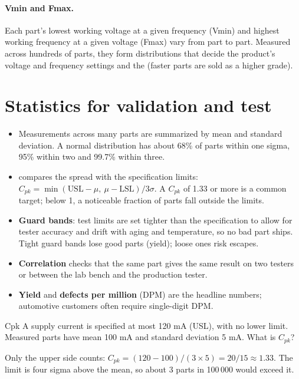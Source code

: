 \paragraph{Vmin and Fmax.} Each part's lowest working voltage at a given frequency (Vmin) and highest working frequency at a given voltage (Fmax) vary from part to part. Measured across hundreds of parts, they form distributions that decide the product's voltage and frequency settings and the  (faster parts are sold as a higher grade).

\section{Statistics for validation and test}

\begin{itemize}
  \item Measurements across many parts are summarized by mean and standard deviation. A normal distribution has about 68\% of parts within one sigma, 95\% within two and 99.7\% within three.
  \item {} compares the spread with the specification limits: $C_{pk} = \min(\text{USL} - \mu,\ \mu - \text{LSL}) / 3\sigma$. A $C_{pk}$ of 1.33 or more is a common target; below 1, a noticeable fraction of parts fall outside the limits.
  \item \textbf{Guard bands}: test limits are set tighter than the specification to allow for tester accuracy and drift with aging and temperature, so no bad part ships. Tight guard bands lose good parts (yield); loose ones risk escapes.
  \item \textbf{Correlation} checks that the same part gives the same result on two testers or between the lab bench and the production tester.
  \item \textbf{Yield} and \textbf{defects per million} (DPM) are the headline numbers; automotive customers often require single-digit DPM.
\end{itemize}

\begin{worked}{Cpk}
A supply current is specified at most 120 mA (USL), with no lower limit. Measured parts have mean 100 mA and standard deviation 5 mA. What is $C_{pk}$?

Only the upper side counts: $C_{pk} = (120 - 100) / (3 \times 5) = 20/15 \approx 1.33$. The limit is four sigma above the mean, so about 3 parts in 100\,000 would exceed it.
\end{worked}

